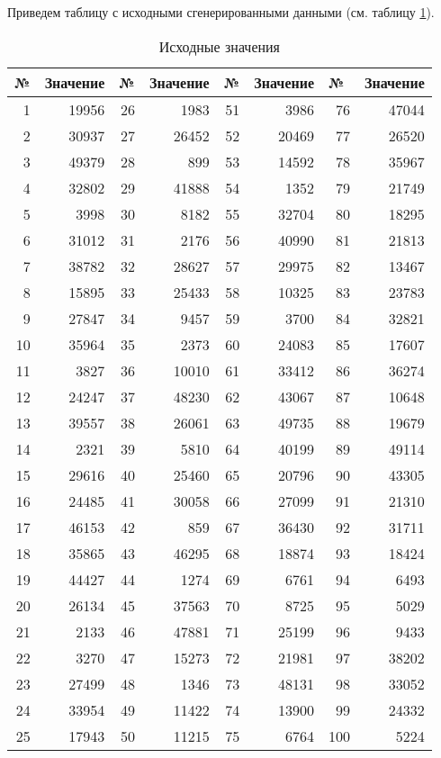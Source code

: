 \documentclass[a4paper,14pt]{extarticle}
\begin{document}
Приведем таблицу с исходными сгенерированными данными (см. таблицу \ref{tab:source}).
\begin{table}[h!]
	\small
	\caption{Исходные значения}
	\centering
	\begin{tabular}{|r|r|r|r|r|r|r|r|}
		\hline
		\multicolumn{1}{|l|}{№} & \multicolumn{1}{l|}{Значение} & \multicolumn{1}{l|}{№} & \multicolumn{1}{l|}{Значение} & \multicolumn{1}{l|}{№} & \multicolumn{1}{l|}{Значение} & \multicolumn{1}{l|}{№} & \multicolumn{1}{l|}{Значение} \\ \hline
		1 & 19956 & 26 & 1983 & 51 & 3986 & 76 & 47044 \\ \hline
		2 & 30937 & 27 & 26452 & 52 & 20469 & 77 & 26520 \\ \hline
		3 & 49379 & 28 & 899 & 53 & 14592 & 78 & 35967 \\ \hline
		4 & 32802 & 29 & 41888 & 54 & 1352 & 79 & 21749 \\ \hline
		5 & 3998 & 30 & 8182 & 55 & 32704 & 80 & 18295 \\ \hline
		6 & 31012 & 31 & 2176 & 56 & 40990 & 81 & 21813 \\ \hline
		7 & 38782 & 32 & 28627 & 57 & 29975 & 82 & 13467 \\ \hline
		8 & 15895 & 33 & 25433 & 58 & 10325 & 83 & 23783 \\ \hline
		9 & 27847 & 34 & 9457 & 59 & 3700 & 84 & 32821 \\ \hline
		10 & 35964 & 35 & 2373 & 60 & 24083 & 85 & 17607 \\ \hline
		11 & 3827 & 36 & 10010 & 61 & 33412 & 86 & 36274 \\ \hline
		12 & 24247 & 37 & 48230 & 62 & 43067 & 87 & 10648 \\ \hline
		13 & 39557 & 38 & 26061 & 63 & 49735 & 88 & 19679 \\ \hline
		14 & 2321 & 39 & 5810 & 64 & 40199 & 89 & 49114 \\ \hline
		15 & 29616 & 40 & 25460 & 65 & 20796 & 90 & 43305 \\ \hline
		16 & 24485 & 41 & 30058 & 66 & 27099 & 91 & 21310 \\ \hline
		17 & 46153 & 42 & 859 & 67 & 36430 & 92 & 31711 \\ \hline
		18 & 35865 & 43 & 46295 & 68 & 18874 & 93 & 18424 \\ \hline
		19 & 44427 & 44 & 1274 & 69 & 6761 & 94 & 6493 \\ \hline
		20 & 26134 & 45 & 37563 & 70 & 8725 & 95 & 5029 \\ \hline
		21 & 2133 & 46 & 47881 & 71 & 25199 & 96 & 9433 \\ \hline
		22 & 3270 & 47 & 15273 & 72 & 21981 & 97 & 38202 \\ \hline
		23 & 27499 & 48 & 1346 & 73 & 48131 & 98 & 33052 \\ \hline
		24 & 33954 & 49 & 11422 & 74 & 13900 & 99 & 24332 \\ \hline
		25 & 17943 & 50 & 11215 & 75 & 6764 & 100 & 5224 \\ \hline
	\end{tabular}
	\label{tab:source}
\end{table}
\end{document}
